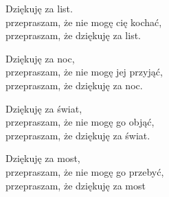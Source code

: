 \begin{text}
    Dziękuję za list.\\
    przepraszam, że nie mogę cię kochać,\\
    przepraszam, że dziękuję za list.

    Dziękuję za noc,\\
    przepraszam, że nie mogę jej przyjąć,\\
    przepraszam, że dziękuję za noc.

    Dziękuję za świat,\\
    przepraszam, że nie mogę go objąć,\\
    przepraszam, że dziękuję za świat.

    Dziękuję za most,\\
    przepraszam, że nie mogę go przebyć,\\
    przepraszam, że dziękuję za most
\end{text}
\begin{chord}

\end{chord}